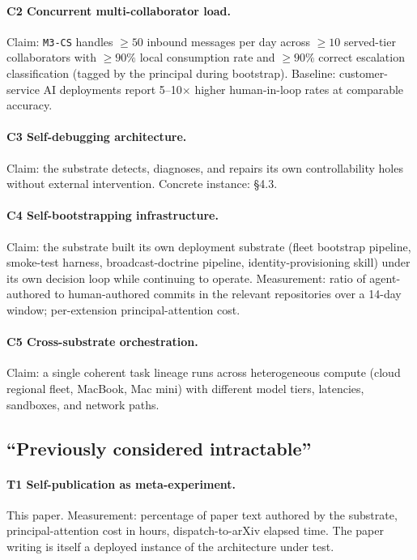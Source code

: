 \documentclass[11pt]{article}
\begin{document}
\paragraph{C2 Concurrent multi-collaborator load.}
Claim: \texttt{M3-CS} handles $\geq 50$ inbound messages per day across $\geq 10$ served-tier collaborators with $\geq 90\%$ local consumption rate and $\geq 90\%$ correct escalation classification (tagged by the principal during bootstrap). Baseline: customer-service AI deployments report 5--10$\times$ higher human-in-loop rates at comparable accuracy.

\paragraph{C3 Self-debugging architecture.}
Claim: the substrate detects, diagnoses, and repairs its own controllability holes without external intervention. Concrete instance: §4.3.

\paragraph{C4 Self-bootstrapping infrastructure.}
Claim: the substrate built its own deployment substrate (fleet bootstrap pipeline, smoke-test harness, broadcast-doctrine pipeline, identity-provisioning skill) under its own decision loop while continuing to operate. Measurement: ratio of agent-authored to human-authored commits in the relevant repositories over a 14-day window; per-extension principal-attention cost.

\paragraph{C5 Cross-substrate orchestration.}
Claim: a single coherent task lineage runs across heterogeneous compute (cloud regional fleet, MacBook, Mac mini) with different model tiers, latencies, sandboxes, and network paths.

\subsection{``Previously considered intractable''}

\paragraph{T1 Self-publication as meta-experiment.}
This paper. Measurement: percentage of paper text authored by the substrate, principal-attention cost in hours, dispatch-to-arXiv elapsed time. The paper writing is itself a deployed instance of the architecture under test.
\end{document}
